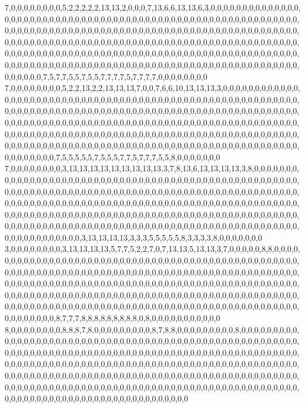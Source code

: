 7,0,0,0,0,0,0,0,0,5,2,2,2,2,2,13,13,2,0,0,0,7,13,6,6,13,13,6,3,0,0,0,0,0,0,0,0,0,0,0,0,0,0,0,0,0,0,0,0,0,0,0,0,0,0,0,0,0,0,0,0,0,0,0,0,0,0,0,0,0,0,0,0,0,0,0,0,0,0,0,0,0,0,0,0,0,0,0,0,0,0,0,0,0,0,0,0,0,0,0,0,0,0,0,0,0,0,0,0,0,0,0,0,0,0,0,0,0,0,0,0,0,0,0,0,0,0,0,0,0,0,0,0,0,0,0,0,0,0,0,0,0,0,0,0,0,0,0,0,0,0,0,0,0,0,0,0,0,0,0,0,0,0,0,0,0,0,0,0,0,0,0,0,0,0,0,0,0,0,0,0,0,0,0,0,0,0,0,0,0,0,0,0,0,0,0,0,0,0,0,0,0,0,0,0,0,0,0,0,0,0,0,0,0,0,0,0,0,0,0,0,0,0,0,0,0,0,0,0,0,0,0,0,0,0,0,0,0,0,0,0,0,0,0,0,0,0,0,0,0,0,0,0,0,0,0,0,0,0,0,0,0,0,0,0,0,0,0,0,0,0,0,0,0,0,0,0,0,0,7,5,7,7,5,5,7,5,5,7,7,7,7,5,7,7,7,7,0,0,0,0,0,0,0,0
7,0,0,0,0,0,0,0,0,5,2,2,13,2,2,13,13,13,7,0,0,7,6,6,10,13,13,13,3,0,0,0,0,0,0,0,0,0,0,0,0,0,0,0,0,0,0,0,0,0,0,0,0,0,0,0,0,0,0,0,0,0,0,0,0,0,0,0,0,0,0,0,0,0,0,0,0,0,0,0,0,0,0,0,0,0,0,0,0,0,0,0,0,0,0,0,0,0,0,0,0,0,0,0,0,0,0,0,0,0,0,0,0,0,0,0,0,0,0,0,0,0,0,0,0,0,0,0,0,0,0,0,0,0,0,0,0,0,0,0,0,0,0,0,0,0,0,0,0,0,0,0,0,0,0,0,0,0,0,0,0,0,0,0,0,0,0,0,0,0,0,0,0,0,0,0,0,0,0,0,0,0,0,0,0,0,0,0,0,0,0,0,0,0,0,0,0,0,0,0,0,0,0,0,0,0,0,0,0,0,0,0,0,0,0,0,0,0,0,0,0,0,0,0,0,0,0,0,0,0,0,0,0,0,0,0,0,0,0,0,0,0,0,0,0,0,0,0,0,0,0,0,0,0,0,0,0,0,0,0,0,0,0,0,0,0,0,0,0,0,0,0,0,0,0,0,0,0,0,7,5,5,5,5,5,7,5,5,5,7,7,5,7,7,7,5,5,8,0,0,0,0,0,0,0
7,0,0,0,0,0,0,0,0,3,13,13,13,13,13,13,13,13,13,3,7,8,13,6,13,13,13,13,3,8,0,0,0,0,0,0,0,0,0,0,0,0,0,0,0,0,0,0,0,0,0,0,0,0,0,0,0,0,0,0,0,0,0,0,0,0,0,0,0,0,0,0,0,0,0,0,0,0,0,0,0,0,0,0,0,0,0,0,0,0,0,0,0,0,0,0,0,0,0,0,0,0,0,0,0,0,0,0,0,0,0,0,0,0,0,0,0,0,0,0,0,0,0,0,0,0,0,0,0,0,0,0,0,0,0,0,0,0,0,0,0,0,0,0,0,0,0,0,0,0,0,0,0,0,0,0,0,0,0,0,0,0,0,0,0,0,0,0,0,0,0,0,0,0,0,0,0,0,0,0,0,0,0,0,0,0,0,0,0,0,0,0,0,0,0,0,0,0,0,0,0,0,0,0,0,0,0,0,0,0,0,0,0,0,0,0,0,0,0,0,0,0,0,0,0,0,0,0,0,0,0,0,0,0,0,0,0,0,0,0,0,0,0,0,0,0,0,0,0,0,0,0,0,0,0,0,0,0,0,0,0,0,0,0,0,0,0,0,0,0,0,0,0,0,0,0,0,0,0,3,13,13,13,13,3,3,3,5,5,5,5,5,8,3,3,3,3,8,0,0,0,0,0,0,0
3,0,0,0,0,0,0,0,0,3,13,13,13,13,5,7,7,5,2,2,7,0,7,13,13,5,13,13,3,7,0,0,0,0,0,8,8,0,0,0,0,0,0,0,0,0,0,0,0,0,0,0,0,0,0,0,0,0,0,0,0,0,0,0,0,0,0,0,0,0,0,0,0,0,0,0,0,0,0,0,0,0,0,0,0,0,0,0,0,0,0,0,0,0,0,0,0,0,0,0,0,0,0,0,0,0,0,0,0,0,0,0,0,0,0,0,0,0,0,0,0,0,0,0,0,0,0,0,0,0,0,0,0,0,0,0,0,0,0,0,0,0,0,0,0,0,0,0,0,0,0,0,0,0,0,0,0,0,0,0,0,0,0,0,0,0,0,0,0,0,0,0,0,0,0,0,0,0,0,0,0,0,0,0,0,0,0,0,0,0,0,0,0,0,0,0,0,0,0,0,0,0,0,0,0,0,0,0,0,0,0,0,0,0,0,0,0,0,0,0,0,0,0,0,0,0,0,0,0,0,0,0,0,0,0,0,0,0,0,0,0,0,0,0,0,0,0,0,0,0,0,0,0,0,0,0,0,0,0,0,0,0,0,0,0,0,0,0,0,0,0,0,0,0,0,0,0,0,0,8,7,7,7,8,8,8,8,8,8,8,8,8,0,8,0,0,0,0,0,0,0,0,0,0,0
8,0,0,0,0,0,0,0,0,8,8,8,7,8,0,0,0,0,0,0,0,0,0,8,7,8,8,0,0,0,0,0,0,0,0,0,8,0,0,0,0,0,0,0,0,0,0,0,0,0,0,0,0,0,0,0,0,0,0,0,0,0,0,0,0,0,0,0,0,0,0,0,0,0,0,0,0,0,0,0,0,0,0,0,0,0,0,0,0,0,0,0,0,0,0,0,0,0,0,0,0,0,0,0,0,0,0,0,0,0,0,0,0,0,0,0,0,0,0,0,0,0,0,0,0,0,0,0,0,0,0,0,0,0,0,0,0,0,0,0,0,0,0,0,0,0,0,0,0,0,0,0,0,0,0,0,0,0,0,0,0,0,0,0,0,0,0,0,0,0,0,0,0,0,0,0,0,0,0,0,0,0,0,0,0,0,0,0,0,0,0,0,0,0,0,0,0,0,0,0,0,0,0,0,0,0,0,0,0,0,0,0,0,0,0,0,0,0,0,0,0,0,0,0,0,0,0,0,0,0,0,0,0,0,0,0,0,0,0,0,0,0,0,0,0,0,0,0,0,0,0,0,0,0,0,0,0,0,0,0,0,0,0,0,0,0,0,0,0,0,0,0,0,0,0,0,0,0,0,0,0,0,0,0,0,0,0,0,0,0,0,0,0,0,0,0,0,0,0,0,0,0,0,0,0
